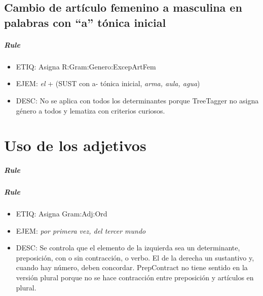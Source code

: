 \documentclass[11pt]{report}
\begin{document}
\section{Cambio de artículo femenino a masculina en palabras con ``a'' tónica inicial}
\paragraph*{Rule}
\begin{itemize}
\item ETIQ: Asigna R:Gram:Genero:ExcepArtFem
\item EJEM: \emph{el} + (SUST con a- tónica inicial, \emph{arma, aula, agua})
\item DESC: No se aplica con todos los determinantes porque TreeTagger no asigna género a todos y lematiza con criterios curiosos.
\end{itemize}

\chapter{Uso de los adjetivos}
\paragraph*{Rule}
\paragraph*{Rule}
\begin{itemize}
\item ETIQ: Asigna Gram:Adj:Ord
\item EJEM: \emph{por primera vez, del tercer mundo} 
\item DESC: Se controla que el elemento de la izquierda sea un determinante, preposición, con o sin contracción, o verbo. El de la derecha un sustantivo y, cuando hay número, deben concordar. PrepContract no tiene sentido en la versión plural porque no se hace contracción entre preposición y artículos en plural.
\end{itemize}
\end{document}

